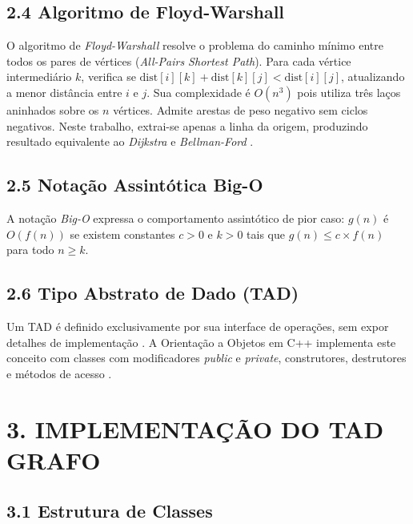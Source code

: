 \documentclass[12pt, a4paper]{article}
\begin{document}
\subsection*{2.4 Algoritmo de Floyd-Warshall}

O algoritmo de \textit{Floyd-Warshall} \cite{cormen2009} resolve o problema do caminho mínimo entre todos os pares de vértices (\textit{All-Pairs Shortest Path}). Para cada vértice intermediário $k$, verifica se $\text{dist}[i][k] + \text{dist}[k][j] < \text{dist}[i][j]$, atualizando a menor distância entre $i$ e $j$. Sua complexidade é $O(n^3)$ pois utiliza três laços aninhados sobre os $n$ vértices. Admite arestas de peso negativo sem ciclos negativos. Neste trabalho, extrai-se apenas a linha da origem, produzindo resultado equivalente ao \textit{Dijkstra} e \textit{Bellman-Ford} \cite{cormen2009, dasgupta2006}.

\subsection*{2.5 Notação Assintótica Big-O}

A notação \textit{Big-O} \cite{neves2026a} expressa o comportamento assintótico de pior caso: $g(n)$ é $O(f(n))$ se existem constantes $c > 0$ e $k > 0$ tais que $g(n) \leq c \times f(n)$ para todo $n \geq k$.

\subsection*{2.6 Tipo Abstrato de Dado (TAD)}

Um TAD é definido exclusivamente por sua interface de operações, sem expor detalhes de implementação \cite{neves2026a}. A Orientação a Objetos em C++ implementa este conceito com classes com modificadores \textit{public} e \textit{private}, construtores, destrutores e métodos de acesso \cite{neves2026b}.

\section*{3. IMPLEMENTAÇÃO DO TAD GRAFO}

\subsection*{3.1 Estrutura de Classes}
\end{document}
